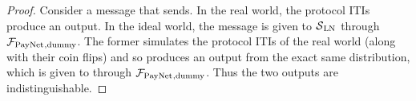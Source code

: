 \begin{proof}
  Consider a message that \environment{} sends. In the real world, the
  protocol ITIs produce an output. In the ideal world, the message is given to
  $\mathcal{S}{}_{\mathrm{LN}}$ through $\mathcal{F}_{\mathrm{PayNet}}{}_{\mathrm{, dummy}}$. The
  former simulates the protocol ITIs of the real world (along with their coin
  flips) and so produces an output from the exact same distribution, which is
  given to \environment{} through $\mathcal{F}_{\mathrm{PayNet}}{}_{\mathrm{, dummy}}$. Thus the
  two outputs are indistinguishable.
\end{proof}
